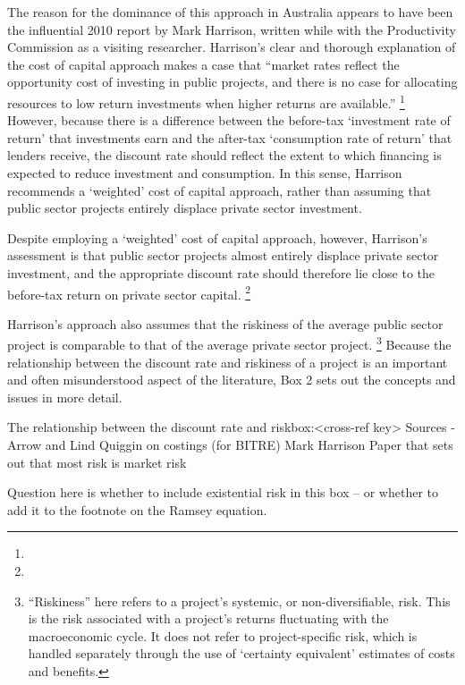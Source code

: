 The reason for the dominance of this approach in Australia appears to have been the influential 2010 report by Mark Harrison, written while with the Productivity Commission as a visiting researcher. Harrison’s clear and thorough explanation of the cost of capital approach makes a case that “market rates reflect the opportunity cost of investing in public projects, and there is no case for allocating resources to low return investments when higher returns are available.”%
    \footnote{}
However, because there is a difference between the before-tax ‘investment rate of return’ that investments earn and the after-tax ‘consumption rate of return’ that lenders receive, the discount rate should reflect the extent to which financing is expected to reduce investment and consumption. In this sense, Harrison recommends a ‘weighted’ cost of capital approach, rather than assuming that public sector projects entirely displace private sector investment. 

Despite employing a ‘weighted’ cost of capital approach, however, Harrison’s assessment is that public sector projects almost entirely displace private sector investment, and the appropriate discount rate should therefore lie close to the before-tax return on private sector capital.%
    \footnote{}

Harrison's approach also assumes that the riskiness of the average public sector project is comparable to that of the average private sector project.%
    \footnote{“Riskiness” here refers to a project’s systemic, or non-diversifiable, risk. This is the risk associated with a project’s returns fluctuating with the macroeconomic cycle. It does not refer to project-specific risk, which is handled separately through the use of ‘certainty equivalent’ estimates of costs and benefits.}
Because the relationship between the discount rate and riskiness of a project is an important and often misunderstood aspect of the literature, Box 2 sets out the concepts and issues in more detail. 

\begin{smallbox}{The relationship between the discount rate and risk}{box:<cross-ref key>}
Sources - 
Arrow and Lind
Quiggin on costings (for BITRE)
Mark Harrison
Paper that sets out that most risk is market risk

Question here is whether to include existential risk in this box -- or whether to add it to the footnote on the Ramsey equation.  

\end{smallbox}

